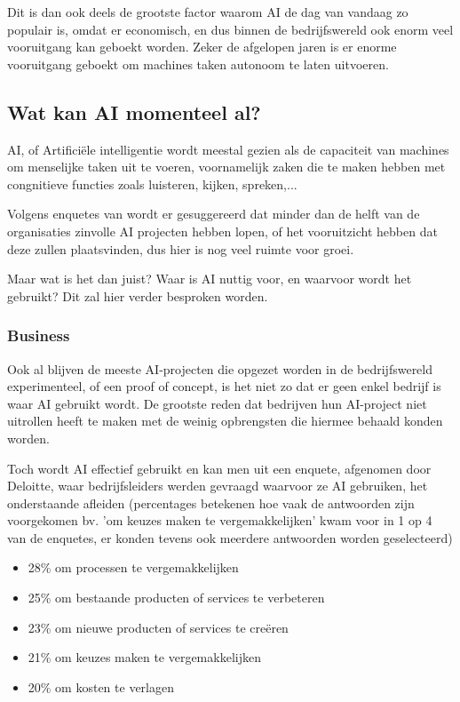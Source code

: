Dit is dan ook deels de grootste factor waarom AI de dag van vandaag zo populair is, omdat er economisch, en dus binnen de bedrijfswereld ook enorm veel vooruitgang kan geboekt worden. Zeker de afgelopen jaren is er enorme vooruitgang geboekt om machines taken autonoom te laten uitvoeren.

\subsection{Wat kan AI momenteel al?}

AI, of Artificiële intelligentie wordt meestal gezien als de capaciteit van machines om menselijke taken uit te voeren, voornamelijk zaken die te maken hebben met congnitieve functies zoals luisteren, kijken, spreken,... 

Volgens enquetes van \cite{benbya2020artificial} wordt er gesuggereerd dat minder dan de helft van de organisaties zinvolle AI projecten hebben lopen, of het vooruitzicht hebben dat deze zullen plaatsvinden, dus hier is nog veel ruimte voor groei. 

Maar wat is het dan juist? Waar is AI nuttig voor, en waarvoor wordt het gebruikt? Dit zal hier verder besproken worden.

\subsubsection{Business}
Ook al blijven de meeste AI-projecten die opgezet worden in de bedrijfswereld experimenteel, of een proof of concept, is het niet zo dat er geen enkel bedrijf is waar AI gebruikt wordt. De grootste reden dat bedrijven hun AI-project niet uitrollen heeft te maken met de weinig opbrengsten die hiermee behaald konden worden.

Toch wordt AI effectief gebruikt en kan men uit een enquete, afgenomen door Deloitte, waar bedrijfsleiders werden gevraagd waarvoor ze AI gebruiken, het onderstaande afleiden (percentages betekenen hoe vaak de antwoorden zijn voorgekomen bv. 'om keuzes maken te vergemakkelijken' kwam voor in 1 op 4 van de enquetes, er konden tevens ook meerdere antwoorden worden geselecteerd)

\begin{itemize}
    \item 28\% om processen te vergemakkelijken
    \item 25\% om bestaande producten of services te verbeteren
    \item 23\% om nieuwe producten of services te creëren
    \item 21\% om keuzes maken te vergemakkelijken
    \item 20\% om kosten te verlagen
\end{itemize}


